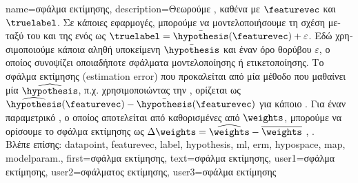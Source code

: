 {name={\foreignlanguage{greek}{σφάλμα εκτίμησης}},
	description={\foreignlanguage{greek}{Θεωρούμε} , 
		\foreignlanguage{greek}{καθένα με}  $\featurevec$ \foreignlanguage{greek}{και}  
		$\truelabel$. \foreignlanguage{greek}{Σε κάποιες εφαρμογές, μπορούμε να μοντελοποιήσουμε τη σχέση μεταξύ του}  
		\foreignlanguage{greek}{και της}  \foreignlanguage{greek}{ενός}  \foreignlanguage{greek}{ως} 
		$\truelabel = \bar{\hypothesis}(\featurevec) + \varepsilon$. \foreignlanguage{greek}{Εδώ χρησιμοποιούμε κάποια αληθή υποκείμενη}
		 $\bar{\hypothesis}$ \foreignlanguage{greek}{και έναν όρο θορύβου $\varepsilon$, 
		ο οποίος συνοψίζει οποιαδήποτε σφάλματα μοντελοποίησης ή ετικετο\-ποί\-ησης. Το σφάλμα εκτίμησης} (estimation error) 
		\foreignlanguage{greek}{που προκαλείται από μία μέθοδο}  \foreignlanguage{greek}{που μαθαίνει μία}  
		$\widehat{\hypothesis}$, \foreignlanguage{greek}{π.χ. χρησιμοποιώντας την} , \foreignlanguage{greek}{ορίζεται ως  
		$\widehat{\hypothesis}(\featurevec) - \bar{\hypothesis}(\featurevec)$ για κάποιο} . 
		\foreignlanguage{greek}{Για έναν παραμετρικό} , \foreignlanguage{greek}{ο οποίος αποτελείται από} 
		  \foreignlanguage{greek}{καθορισμένες από}  $\weights$, 
		\foreignlanguage{greek}{μπορούμε να ορίσουμε το σφάλμα εκτίμησης ως} $\Delta \weights = \widehat{\weights} - \overline{\weights}$ 
		\cite{hastie01statisticallearning}, \cite{kay}.
		\\
		\foreignlanguage{greek}{Βλέπε επίσης:} \gls{datapoint}, \gls{featurevec}, \gls{label}, \gls{hypothesis}, \gls{ml}, \gls{erm}, \gls{hypospace}, 
		\gls{map}, \gls{modelparam}.},
	first={\foreignlanguage{greek}{σφάλμα εκτίμησης}},
	text={\foreignlanguage{greek}{σφάλμα εκτίμησης}},
	user1={\foreignlanguage{greek}{σφάλμα εκτίμησης}}, %
    	user2={\foreignlanguage{greek}{σφάλματος εκτίμησης}}, %
	user3={\foreignlanguage{greek}{σφάλμα εκτίμησης}} %
}

